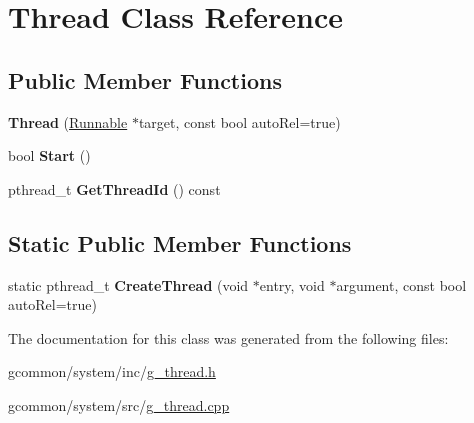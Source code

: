 \hypertarget{class_thread}{\section{Thread Class Reference}
\label{class_thread}
}
\subsection*{Public Member Functions}
\begin{DoxyCompactItemize}
\item 
\hypertarget{class_thread_ac90033f2640b175ecb0df2212172e65e}{{\bfseries Thread} (\hyperlink{class_runnable}{Runnable} $\ast$target, const bool auto\-Rel=true)}\label{class_thread_ac90033f2640b175ecb0df2212172e65e}

\item 
\hypertarget{class_thread_a279c2b78aa2bf43371f2462623588830}{bool {\bfseries Start} ()}\label{class_thread_a279c2b78aa2bf43371f2462623588830}

\item 
\hypertarget{class_thread_a81ac4cfd9d0327fdab907c4e173af6b2}{pthread\-\_\-t {\bfseries Get\-Thread\-Id} () const }\label{class_thread_a81ac4cfd9d0327fdab907c4e173af6b2}

\end{DoxyCompactItemize}
\subsection*{Static Public Member Functions}
\begin{DoxyCompactItemize}
\item 
\hypertarget{class_thread_abe2166ea1ec764ced0792353c0ecb538}{static pthread\-\_\-t {\bfseries Create\-Thread} (void $\ast$entry, void $\ast$argument, const bool auto\-Rel=true)}\label{class_thread_abe2166ea1ec764ced0792353c0ecb538}

\end{DoxyCompactItemize}


The documentation for this class was generated from the following files\-:\begin{DoxyCompactItemize}
\item 
gcommon/system/inc/\hyperlink{g__thread_8h}{g\-\_\-thread.\-h}\item 
gcommon/system/src/\hyperlink{g__thread_8cpp}{g\-\_\-thread.\-cpp}\end{DoxyCompactItemize}
